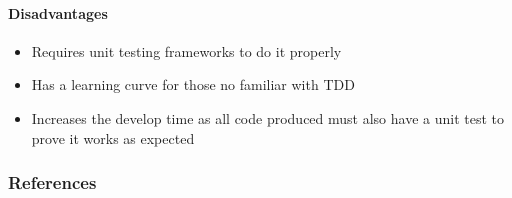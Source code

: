 \paragraph*{Disadvantages}
\begin{itemize}
\item Requires unit testing frameworks to do it properly
\item Has a learning curve for those no familiar with TDD
\item Increases the develop time as all code produced must also have a unit
test to prove it works as expected
\end{itemize}

\subsubsection*{References}
